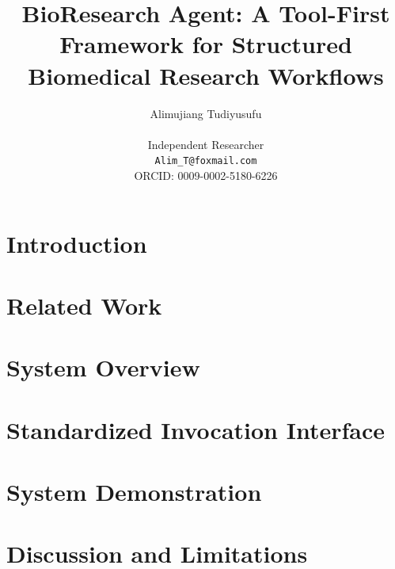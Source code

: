 \documentclass[11pt]{article}
\title{BioResearch Agent: A Tool-First Framework for Structured Biomedical Research Workflows}
\author{Alimujiang Tudiyusufu\\\\[2pt]Independent Researcher\\\texttt{Alim\_T@foxmail.com}\\ORCID: 0009-0002-5180-6226}
\date{}
\begin{document}


\maketitle



\section{Introduction}


\section{Related Work}


\section{System Overview}


\section{Standardized Invocation Interface}
\label{sec:skill}


\section{System Demonstration}


\section{Discussion and Limitations}






\end{document}
